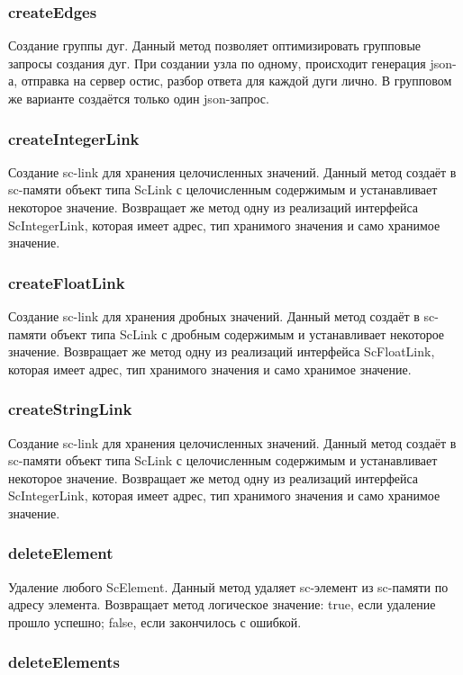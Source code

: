 \subsubsection {createEdges} 

Создание группы дуг. Данный метод позволяет оптимизировать групповые запросы создания дуг. При создании узла по одному, происходит генерация json-а, отправка на сервер остис, разбор ответа для каждой дуги лично. В групповом же варианте создаётся только один json-запрос. 
\subsubsection {createIntegerLink} 

Создание sc-link для хранения целочисленных значений. Данный метод создаёт в sc-памяти объект типа ScLink с целочисленным содержимым и устанавливает некоторое значение. Возвращает же метод одну из реализаций интерфейса {ScIntegerLink}, которая имеет адрес, тип хранимого значения и само хранимое значение. 
\subsubsection {createFloatLink} 

Создание sc-link для хранения дробных значений. Данный метод создаёт в sc-памяти объект типа ScLink с дробным содержимым и устанавливает некоторое значение. Возвращает же метод одну из реализаций интерфейса ScFloatLink, которая имеет адрес, тип хранимого значения и само хранимое значение. 
\subsubsection {createStringLink} 

Создание sc-link для хранения целочисленных значений. Данный метод создаёт в sc-памяти объект типа ScLink с целочисленным содержимым и устанавливает некоторое значение. Возвращает же метод одну из реализаций интерфейса ScIntegerLink, которая имеет адрес, тип хранимого значения и само хранимое значение. 
\subsubsection {deleteElement} 

Удаление любого ScElement. Данный метод удаляет sc-элемент из sc-памяти по адресу элемента. Возвращает метод логическое значение: true, если удаление прошло успешно; false, если закончилось с ошибкой. 
\subsubsection {deleteElements} 


